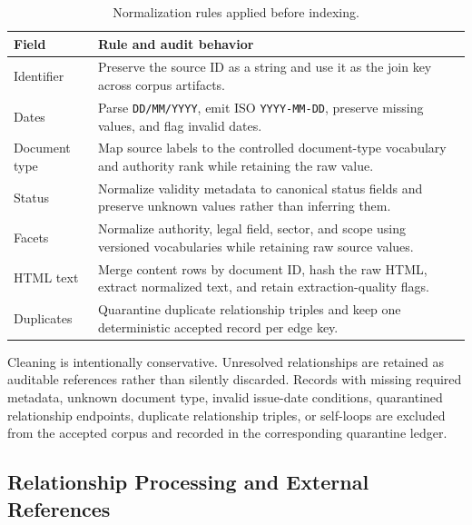 \begin{table}[t]
\centering
\scriptsize
\caption{Normalization rules applied before indexing.}
\label{tab:normalization-rules}

\begin{tabularx}{\columnwidth}{@{}p{}X@{}}
\toprule
\textbf{Field} & \textbf{Rule and audit behavior} \\
\midrule

Identifier &
Preserve the source ID as a string and use it as the join key across corpus artifacts. \\

Dates &
Parse \texttt{DD/MM/YYYY}, emit ISO \texttt{YYYY-MM-DD}, preserve missing values, and flag invalid dates. \\

Document type &
Map source labels to the controlled document-type vocabulary and authority rank while retaining the raw value. \\

Status &
Normalize validity metadata to canonical status fields and preserve unknown values rather than inferring them. \\

Facets &
Normalize authority, legal field, sector, and scope using versioned vocabularies while retaining raw source values. \\

HTML text &
Merge content rows by document ID, hash the raw HTML, extract normalized text, and retain extraction-quality flags. \\

Duplicates &
Quarantine duplicate relationship triples and keep one deterministic accepted record per edge key. \\

\bottomrule
\end{tabularx}
\end{table}

Cleaning is intentionally conservative. Unresolved relationships are retained as auditable references rather than silently discarded. Records with missing required metadata, unknown document type, invalid issue-date conditions, quarantined relationship endpoints, duplicate relationship triples, or self-loops are excluded from the accepted corpus and recorded in the corresponding quarantine ledger.

\subsection{Relationship Processing and External References}
\label{sec:relationship-processing}

